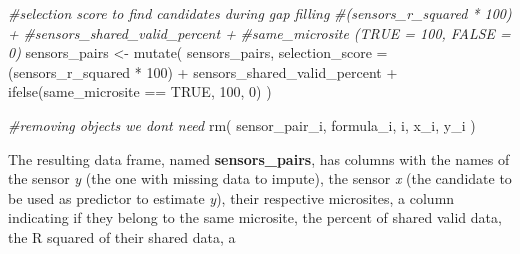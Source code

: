 \documentclass[
  table]{article}
\newenvironment{Shaded}{\begin{snugshade}}{\end{snugshade}}
\newcommand{\AttributeTok}[1]{\textcolor[rgb]{0.77,0.63,0.00}{#1}}
\newcommand{\CommentTok}[1]{\textcolor[rgb]{0.56,0.35,0.01}{\textit{#1}}}
\newcommand{\ConstantTok}[1]{\textcolor[rgb]{0.00,0.00,0.00}{#1}}
\newcommand{\DecValTok}[1]{\textcolor[rgb]{0.00,0.00,0.81}{#1}}
\newcommand{\FunctionTok}[1]{\textcolor[rgb]{0.00,0.00,0.00}{#1}}
\newcommand{\NormalTok}[1]{#1}
\newcommand{\OtherTok}[1]{\textcolor[rgb]{0.56,0.35,0.01}{#1}}
\newcommand{\SpecialCharTok}[1]{\textcolor[rgb]{0.00,0.00,0.00}{#1}}
\begin{document}
\begin{Shaded}
\begin{Highlighting}[]
\CommentTok{\#selection score to find candidates during gap filling }
\CommentTok{\#(sensors\_r\_squared * 100) +}
\CommentTok{\#sensors\_shared\_valid\_percent + }
\CommentTok{\#same\_microsite (TRUE = 100, FALSE = 0)}
\NormalTok{sensors\_pairs }\OtherTok{\textless{}{-}} \FunctionTok{mutate}\NormalTok{(}
\NormalTok{  sensors\_pairs,}
  \AttributeTok{selection\_score =} 
\NormalTok{    (sensors\_r\_squared }\SpecialCharTok{*} \DecValTok{100}\NormalTok{) }\SpecialCharTok{+} 
\NormalTok{    sensors\_shared\_valid\_percent }\SpecialCharTok{+} 
    \FunctionTok{ifelse}\NormalTok{(same\_microsite }\SpecialCharTok{==} \ConstantTok{TRUE}\NormalTok{, }\DecValTok{100}\NormalTok{, }\DecValTok{0}\NormalTok{)}
\NormalTok{)}

\CommentTok{\#removing objects we don\textquotesingle{}t need}
\FunctionTok{rm}\NormalTok{(}
\NormalTok{  sensor\_pair\_i,}
\NormalTok{  formula\_i,}
\NormalTok{  i,}
\NormalTok{  x\_i,}
\NormalTok{  y\_i}
\NormalTok{)}
\end{Highlighting}
\end{Shaded}

The resulting data frame, named \textbf{sensors\_pairs}, has columns
with the names of the sensor \emph{y} (the one with missing data to
impute), the sensor \emph{x} (the candidate to be used as predictor to
estimate \emph{y}), their respective microsites, a column indicating if
they belong to the same microsite, the percent of shared valid data, the
R squared of their shared data, a
\end{document}
